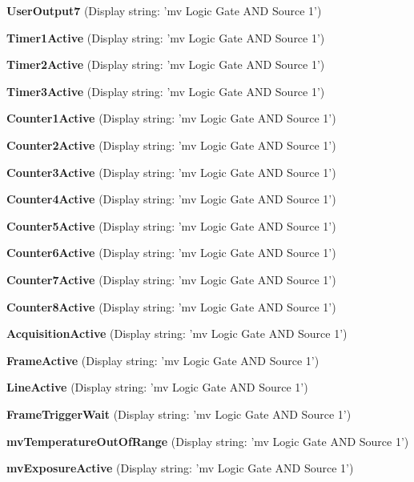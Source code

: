 \begin{DoxyItemize}
\item {\bfseries User\+Output7} (Display string\+: 'mv Logic Gate A\+N\+D Source 1')
\item {\bfseries Timer1\+Active} (Display string\+: 'mv Logic Gate A\+N\+D Source 1')
\item {\bfseries Timer2\+Active} (Display string\+: 'mv Logic Gate A\+N\+D Source 1')
\item {\bfseries Timer3\+Active} (Display string\+: 'mv Logic Gate A\+N\+D Source 1')
\item {\bfseries Counter1\+Active} (Display string\+: 'mv Logic Gate A\+N\+D Source 1')
\item {\bfseries Counter2\+Active} (Display string\+: 'mv Logic Gate A\+N\+D Source 1')
\item {\bfseries Counter3\+Active} (Display string\+: 'mv Logic Gate A\+N\+D Source 1')
\item {\bfseries Counter4\+Active} (Display string\+: 'mv Logic Gate A\+N\+D Source 1')
\item {\bfseries Counter5\+Active} (Display string\+: 'mv Logic Gate A\+N\+D Source 1')
\item {\bfseries Counter6\+Active} (Display string\+: 'mv Logic Gate A\+N\+D Source 1')
\item {\bfseries Counter7\+Active} (Display string\+: 'mv Logic Gate A\+N\+D Source 1')
\item {\bfseries Counter8\+Active} (Display string\+: 'mv Logic Gate A\+N\+D Source 1')
\item {\bfseries Acquisition\+Active} (Display string\+: 'mv Logic Gate A\+N\+D Source 1')
\item {\bfseries Frame\+Active} (Display string\+: 'mv Logic Gate A\+N\+D Source 1')
\item {\bfseries Line\+Active} (Display string\+: 'mv Logic Gate A\+N\+D Source 1')
\item {\bfseries Frame\+Trigger\+Wait} (Display string\+: 'mv Logic Gate A\+N\+D Source 1')
\item {\bfseries mv\+Temperature\+Out\+Of\+Range} (Display string\+: 'mv Logic Gate A\+N\+D Source 1')
\item {\bfseries mv\+Exposure\+Active} (Display string\+: 'mv Logic Gate A\+N\+D Source 1')
\end{DoxyItemize}

